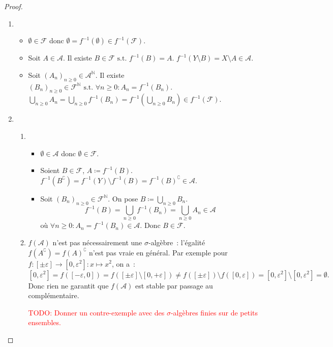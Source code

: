 \documentclass{article}
\newcommand{\TODO}[1]{\textcolor{red}{TODO: #1}}
\newcommand{\st}{\text{ s.t. }}
\newcommand{\C}{\complement}
\newcommand{\N}{{\mathbb N}}
\begin{document}
\begin{proof}~
\begin{enumerate}
	\item~
	\begin{itemize}
		\item $\emptyset \in \mathcal F$ donc $\emptyset = f^{-1}(\emptyset) \in f^{-1}(\mathcal F)$.
		\item Soit $A \in \mathcal A$. Il existe $B \in \mathcal F \st f^{-1}(B) = A$. $f^{-1}(Y \setminus B) = X \setminus A \in \mathcal A$.
		\item Soit $(A_n)_{n \geq 0} \in \mathcal A^\N$. Il existe $(B_n)_{n \geq 0} \in \mathcal F^\N \st \forall n \geq 0 : A_n = f^{-1}(B_n)$.
		$\bigcup_{n \geq 0}A_n = \bigcup_{n \geq 0}f^{-1}(B_n) = f^{-1}\left(\bigcup_{n \geq 0}B_n\right) \in f^{-1}(\mathcal F)$.
	\end{itemize}
	\item~
	\begin{enumerate}
		\item~
		\begin{itemize}
			\item $\emptyset \in \mathcal A$ donc $\emptyset \in \mathcal F$.
			\item Soient $B \in \mathcal F$, $A \coloneqq f^{-1}(B)$. $f^{-1}(B^\C) = f^{-1}(Y) \setminus f^{-1}(B) = f^{-1}(B)^\C \in \mathcal A$.
			\item Soit $(B_n)_{n \geq 0} \in \mathcal F^\N$. On pose $B \coloneqq \bigcup_{n \geq 0}B_n$.
			\[f^{-1}(B) = \bigcup_{n \geq 0}f^{-1}(B_n) = \bigcup_{n \geq 0}A_n \in \mathcal A\]
			où $\forall n \geq 0 : A_n = f^{-1}(B_n) \in \mathcal A$. Donc $B \in \mathcal F$.
		\end{itemize}
		\item $f(\mathcal A)$ n'est pas nécessairement une $\sigma$-algèbre~: l'égalité $f(A^\C) = f(A)^\C$ n'est pas vraie en général. Par exemple pour
		$f : [\pm\varepsilon] \to [0, \varepsilon^2] : x \mapsto x^2$, on a~:
		\[[0, \varepsilon^2] = f([-\varepsilon, 0]) = f([\pm\varepsilon] \setminus [0, +\varepsilon])
		  \neq f([\pm\varepsilon]) \setminus f([0, \varepsilon]) = [0, \varepsilon^2] \setminus [0, \varepsilon^2] = \emptyset.\]
		Donc rien ne garantit que $f(\mathcal A)$ est stable par passage au complémentaire.

		\TODO{Donner un contre-exemple avec des $\sigma$-algèbres finies sur de petits ensembles.}
	\end{enumerate}
\end{enumerate}
\end{proof}
\end{document}

